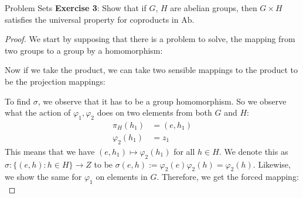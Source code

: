 \documentclass{report}
\begin{document}
\begin{exercises}{Problem Sets}
    \textbf{Exercise 3}: Show that if $G$, $H$ are abelian groups, then $G \times H$ satisfies the universal property for coproducts in $\text{Ab}$.
        \begin{proof}
            We start by supposing that there is a problem to solve, the mapping from two groups to a group by a homomorphism:
                \begin{center}
                \end{center}
            Now if we take the product, we can take two sensible mappings to the product to be the projection mappings:
                \begin{center}
                \end{center}
            To find $\sigma$, we observe that it has to be a group homomorphism. So we observe what the action of $\varphi_{1}, \varphi_{2}$ does on two elements from both $G$ and $H$:
                \begin{align*}
                    \pi_{H}(h_{1})     &= (e, h_{1}) \\
                    \varphi_{2}(h_{1}) &= z_{1}        
                \end{align*}
            This means that we have $(e, h_{1}) \mapsto \varphi_{2}(h_{1})$ for all $h \in H$. We denote this as $\sigma: \{(e, h): h \in H\} \rightarrow Z$ to be $\sigma(e, h) := \varphi_{2}(e)\varphi_{2}(h) = \varphi_{2}(h)$. Likewise, we show the same for $\varphi_{1}$ on elements in $G$. Therefore, we get the forced mapping:
                \begin{equation*}

\end{equation*}
\end{proof}
\end{exercises}
\end{document}
